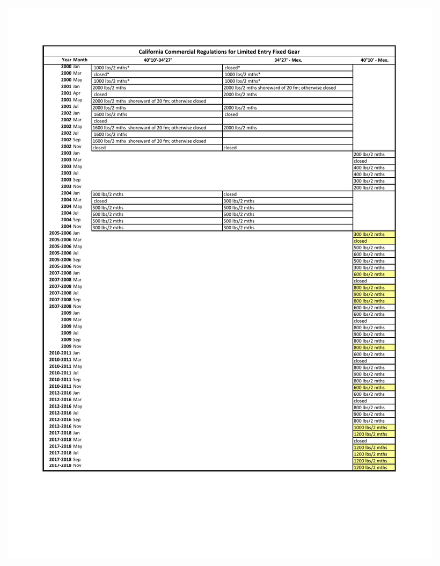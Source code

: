 \documentclass[12pt,]{article}
\begin{document}
\begin{figure}
\centering
\includegraphics{Figures/Comm_regs2.pdf}
\caption{\label{fig:Comm_regs2}}
\end{figure}

\FloatBarrier
\end{document}
